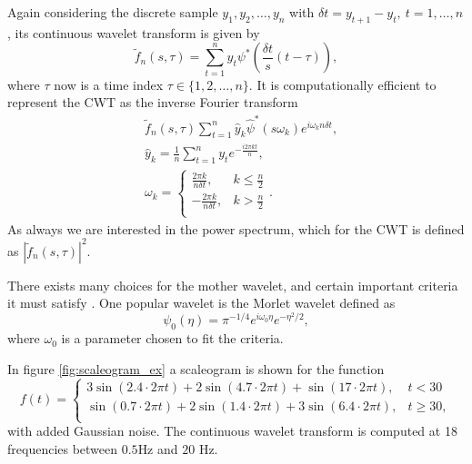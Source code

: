 \documentclass[a4paper, 10pt]{memoir}
\theoremstyle{plain}
\theoremstyle{definition}
\theoremstyle{remark}
\begin{document}
Again considering the discrete sample $y_1, y_2, \hdots, y_n$ with $\delta t = y_{t+1} - y_t, \ t = 1, \hdots, n$, its continuous wavelet transform is given by \cite{torrence}
\begin{equation}\label{eq:cwt_d}
        \tilde{f}_n(s, \tau) = \sum_{t = 1}^{n} y_t \psi^* \left( \frac{\delta t}{s}(t- \tau) \right),
\end{equation}
where $\tau$ now is a time index $\tau \in \{ 1, 2, \hdots, n \}$.
It is computationally efficient \cite{torrence} to represent the CWT as the inverse Fourier transform
\begin{align*}
        &\tilde{f}_n(s, \tau) \sum_{t = 1}^{n}\hat{y}_k \hat{\psi}^*(s\omega_k)e^{i \omega_k n\delta t}, \\
        & \hat{y}_k = \frac{1}{n}\sum_{t = 1}^{n}y_t e^{-\frac{i2\pi kt}{n}},\\
        &\omega_k = 
                \begin{cases}
                      \frac{2\pi k}{n \delta t},   &  k \leq \frac{n}{2} \\
                      -\frac{2\pi k}{n \delta t},   &  k > \frac{n}{2} \\
                \end{cases}.
\end{align*}
As always we are interested in the power spectrum, which for the CWT is defined as $|\tilde{f}_n(s,\tau)|^2$.

There exists many choices for the mother wavelet, and certain important criteria it must satisfy \cite{kaiser}.
One popular wavelet is the Morlet wavelet defined as
\begin{equation}\label{eq:morlet}
        \psi_0(\eta) = \pi^{-1/4} e^{i\omega_0 \eta}e^{-\eta^2 / 2},
\end{equation}
where $\omega_0$ is a parameter chosen to fit the criteria.

In figure \ref{fig:scaleogram_ex} a scaleogram is shown for the function
\begin{equation}\label{eq:ex_scale}
        f(t) = 
                \begin{cases}
                        3 \sin(2.4 \cdot 2\pi t) + 2 \sin(4.7 \cdot 2 \pi t) + \sin(17 \cdot 2 \pi t), & t < 30 \\
                        \sin(0.7 \cdot 2 \pi t) + 2 \sin(1.4 \cdot 2 \pi t) + 3 \sin(6.4 \cdot 2 \pi t), & t \geq 30, \\
                \end{cases}
\end{equation}
with added Gaussian noise.
The continuous wavelet transform is computed at 18 frequencies between $0.5$Hz and $20$ Hz.
\end{document}
